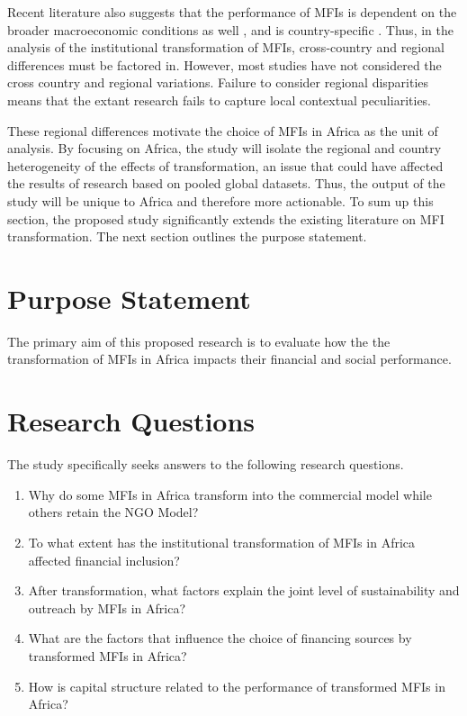 \documentclass[a4paper, nobind]{templates/ociamthesis}
\providecommand{\tightlist}{%
  \setlength{\itemsep}{0pt}\setlength{\parskip}{0pt}}
\begin{document}
Recent literature also suggests that the performance of MFIs is dependent on the broader macroeconomic conditions as well \textcite{ahlin2011does}, and is country-specific \autocite{d2017ngos}. Thus, in the analysis of the institutional transformation of MFIs, cross-country and regional differences must be factored in. However, most studies have not considered the cross country and regional variations. Failure to consider regional disparities means that the extant research fails to capture local contextual peculiarities.

These regional differences motivate the choice of MFIs in Africa as the unit of analysis. By focusing on Africa, the study will isolate the regional and country heterogeneity of the effects of transformation, an issue that could have affected the results of research based on pooled global datasets. Thus, the output of the study will be unique to Africa and therefore more actionable. To sum up this section, the proposed study significantly extends the existing literature on MFI transformation. The next section outlines the purpose statement.

\hypertarget{purpose-statement}{%
\section{Purpose Statement}\label{purpose-statement}}

\noindent The primary aim of this proposed research is to evaluate how the the transformation of MFIs in Africa impacts their financial and social performance.

\hypertarget{research-questions}{%
\section{Research Questions}\label{research-questions}}

\noindent The study specifically seeks answers to the following research questions.

\begin{enumerate}
\def\labelenumi{\arabic{enumi}.}
\tightlist
\item
  Why do some MFIs in Africa transform into the commercial model while others retain the NGO Model?
\item
  To what extent has the institutional transformation of MFIs in Africa affected financial inclusion?
\item
  After transformation, what factors explain the joint level of sustainability and outreach by MFIs in Africa?
\item
  What are the factors that influence the choice of financing sources by transformed MFIs in Africa?
\item
  How is capital structure related to the performance of transformed MFIs in Africa?
\end{enumerate}
\end{document}
